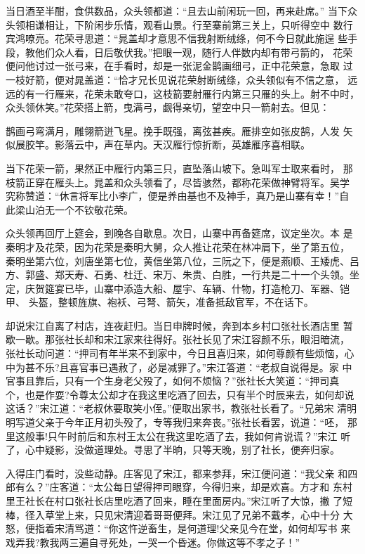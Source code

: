 当日酒至半酣，食供数品，众头领都道：“且去山前闲玩一回，再来赴席。”
当下众头领相谦相让，下阶闲步乐情，观看山景。行至寨前第三关上，只听得空中
数行宾鸿嘹亮。花荣寻思道：“晁盖却才意思不信我射断绒绦，何不今日就此施逞
些手段，教他们众人看，日后敬伏我。”把眼一观，随行人伴数内却有带弓箭的，
花荣便问他讨过一张弓来，在手看时，却是一张泥金鹊画细弓，正中花荣意，急取
过一枝好箭，便对晁盖道：“恰才兄长见说花荣射断绒绦，众头领似有不信之意，
远远的有一行雁来，花荣未敢夸口，这枝箭要射雁行内第三只雁的头上。射不中时，
众头领休笑。”花荣搭上箭，曳满弓，觑得亲切，望空中只一箭射去。但见：

鹊画弓弯满月，雕翎箭迸飞星。挽手既强，离弦甚疾。雁排空如张皮鹄，人发
矢似展胶竿。影落云中，声在草内。天汉雁行惊折断，英雄雁序喜相联。

当下花荣一箭，果然正中雁行内第三只，直坠落山坡下。急叫军士取来看时，
那枝箭正穿在雁头上。晁盖和众头领看了，尽皆骇然，都称花荣做神臂将军。吴学
究称赞道：“休言将军比小李广，便是养由基也不及神手，真乃是山寨有幸！”自
此梁山泊无一个不钦敬花荣。

众头领再回厅上筵会，到晚各自歇息。次日，山寨中再备筵席，议定坐次。本
是秦明才及花荣，因为花荣是秦明大舅，众人推让花荣在林冲肩下，坐了第五位，
秦明坐第六位，刘唐坐第七位，黄信坐第八位，三阮之下，便是燕顺、王矮虎、吕
方、郭盛、郑天寿、石勇、杜迁、宋万、朱贵、白胜，一行共是二十一个头领。坐
定，庆贺筵宴已毕，山寨中添造大船、屋宇、车辆、什物，打造枪刀、军器、铠甲、
头盔，整顿旌旗、袍袄、弓弩、箭矢，准备抵敌官军，不在话下。

却说宋江自离了村店，连夜赶归。当日申牌时候，奔到本乡村口张社长酒店里
暂歇一歇。那张社长却和宋江家来往得好。张社长见了宋江容颜不乐，眼泪暗流，
张社长动问道：“押司有年半来不到家中，今日且喜归来，如何尊颜有些烦恼，心
中为甚不乐?且喜官事已遇赦了，必是减罪了。”宋江答道：“老叔自说得是。家
中官事且靠后，只有一个生身老父殁了，如何不烦恼？”张社长大笑道：“押司真
个，也是作耍?令尊太公却才在我这里吃酒了回去，只有半个时辰来去，如何却说
这话？”宋江道：“老叔休要取笑小侄。”便取出家书，教张社长看了。“兄弟宋
清明明写道父亲于今年正月初头殁了，专等我归来奔丧。”张社长看罢，说道：“呸，
那里这般事!只午时前后和东村王太公在我这里吃酒了去，我如何肯说谎？”宋江
听了，心中疑影，没做道理处。寻思了半晌，只等天晚，别了社长，便奔归家。

入得庄门看时，没些动静。庄客见了宋江，都来参拜，宋江便问道：“我父亲
和四郎有么？”庄客道：“太公每日望得押司眼穿，今得归来，却是欢喜。方才和
东村里王社长在村口张社长店里吃酒了回来，睡在里面房内。”宋江听了大惊，撇
了短棒，径入草堂上来，只见宋清迎着哥哥便拜。宋江见了兄弟不戴孝，心中十分
大怒，便指着宋清骂道：“你这忤逆畜生，是何道理!父亲见今在堂，如何却写书
来戏弄我?教我两三遍自寻死处，一哭一个昏迷。你做这等不孝之子！”

